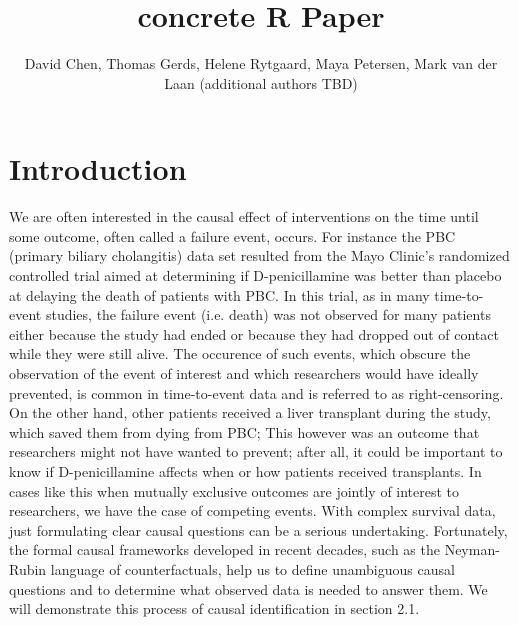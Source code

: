 \documentclass{report}
\author{David Chen, Thomas Gerds, Helene Rytgaard, Maya Petersen, Mark van der Laan (additional authors TBD)}
\date{}
\title{concrete R Paper}
\newcommand{\1}{\ensuremath{\mathbf{1}}}
\begin{document}
\maketitle
{}

\tableofcontents

\chapter{Introduction}
We are often interested in the causal effect of interventions on the time until some outcome, often called a failure event, occurs. For instance the PBC (primary biliary cholangitis) data set resulted from the Mayo Clinic's randomized controlled trial aimed at determining if D-penicillamine was better than placebo at delaying the death of patients with PBC. In this trial, as in many time-to-event studies, the failure event (i.e. death) was not observed for many patients either because the study had ended or because they had dropped out of contact while they were still alive. The occurence of such events, which obscure the observation of the event of interest and which researchers would have ideally prevented, is common in time-to-event data and is referred to as right-censoring. On the other hand, other patients received a liver transplant during the study, which saved them from dying from PBC; This however was an outcome that researchers might not have wanted to prevent; after all, it could be important to know if D-penicillamine affects when or how patients received transplants. In cases like this when mutually exclusive outcomes are jointly of interest to researchers, we have the case of competing events. With complex survival data, just formulating clear causal questions can be a serious undertaking. Fortunately, the formal causal frameworks developed in recent decades, such as the Neyman-Rubin language of counterfactuals, help us to define unambiguous causal questions and to determine what observed data is needed to answer them. We will demonstrate this process of causal identification in section 2.1.
\end{document}
